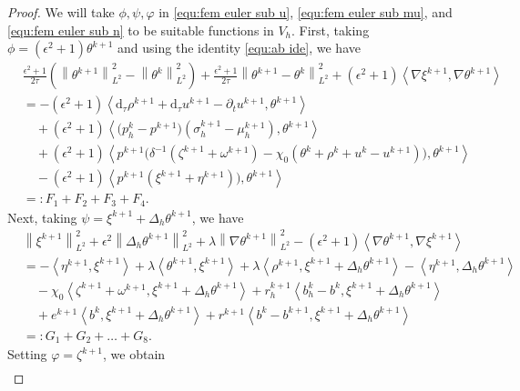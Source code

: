 \documentclass[11pt, reqno]{amsart}
\theoremstyle{definition}
\numberwithin{equation}{section}
\newcommand{\dtt}{\mathrm{d}_\tau}
\newcommand{\norm}[2]{\left\|{#1}\right\|_{#2}}
\newcommand{\inpro}[2]{\left\langle#1,#2\right\rangle}
\begin{document}
\begin{proof}
We will take $\phi,\psi,\varphi$ in \eqref{equ:fem euler sub u}, \eqref{equ:fem euler sub mu}, and \eqref{equ:fem euler sub n} to be suitable functions in $V_h$. First, taking $\phi=(\epsilon^2 +1) \theta^{k+1}$ and using the identity \eqref{equ:ab ide}, we have
\begin{align}\label{equ:12 tau theta u L2}
	&\frac{\epsilon^2 +1}{2\tau} \left(\norm{\theta^{k+1}}{L^2}^2 - \norm{\theta^k}{L^2}^2 \right)
	+
	\frac{\epsilon^2 +1}{2\tau} \norm{\theta^{k+1}-\theta^k}{L^2}^2
	+
	(\epsilon^2 +1) \inpro{\nabla \xi^{k+1}}{\nabla \theta^{k+1}}
	\nonumber\\
	&=
	-
	(\epsilon^2 +1) \inpro{\dtt \rho^{k+1}+\dtt u^{k+1}-\partial_t u^{k+1}}{\theta^{k+1}}
	\nonumber\\
	&\quad
	+
	(\epsilon^2 +1) \inpro{\big(p_h^k-p^{k+1}\big) (\sigma_h^{k+1}-\mu_h^{k+1})}{\theta^{k+1}}
	\nonumber\\
	&\quad
	+
	(\epsilon^2 +1) \inpro{p^{k+1} \big(\delta^{-1}(\zeta^{k+1}+\omega^{k+1}) - \chi_0(\theta^k+\rho^k+u^k-u^{k+1})\big)}{\theta^{k+1}}
	\nonumber\\
	&\quad
	-
	(\epsilon^2 +1) \inpro{p^{k+1} (\xi^{k+1}+\eta^{k+1})\big)}{\theta^{k+1}}
	\nonumber\\
	&=:F_1+F_2+F_3+F_4.
\end{align}
Next, taking $\psi=\xi^{k+1}+ \Delta_h \theta^{k+1}$, we have
\begin{align}\label{equ:xi mu L2 eq}
	&\norm{\xi^{k+1}}{L^2}^2
	+
	\epsilon^2 \norm{\Delta_h \theta^{k+1}}{L^2}^2
	+
	\lambda \norm{\nabla \theta^{k+1}}{L^2}^2
	-
	(\epsilon^2+1) \inpro{\nabla \theta^{k+1}}{\nabla \xi^{k+1}}
	\nonumber\\
	&=
	-
	\inpro{\eta^{k+1}}{\xi^{k+1}}
	+
	\lambda \inpro{\theta^{k+1}}{\xi^{k+1}}
	+
	\lambda \inpro{\rho^{k+1}}{\xi^{k+1}+\Delta_h \theta^{k+1}}
		-
	\inpro{\eta^{k+1}}{\Delta_h \theta^{k+1}}
	\nonumber\\
	&\quad
	-
	\chi_0 \inpro{\zeta^{k+1}+\omega^{k+1}}{\xi^{k+1}+ \Delta_h \theta^{k+1}}
		+
	r_h^{k+1} \inpro{b_h^k-b^k}{\xi^{k+1}+ \Delta_h \theta^{k+1}}
	\nonumber\\
	&\quad
	+ 
	e^{k+1} \inpro{b^k}{\xi^{k+1}+ \Delta_h \theta^{k+1}}
	+
	r^{k+1} \inpro{b^k-b^{k+1}}{\xi^{k+1}+ \Delta_h \theta^{k+1}}
	\nonumber\\
	&=: 
	G_1+G_2+\ldots+G_8.
\end{align}
Setting $\varphi=\zeta^{k+1}$, we obtain
\begin{align}\label{equ:12 tau theta n}

\end{align}
\end{proof}
\end{document}
